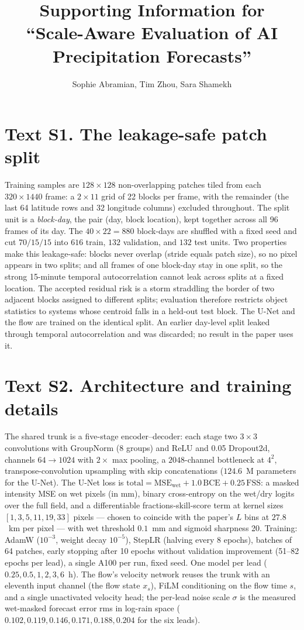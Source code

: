 \documentclass[11pt]{article}
\title{Supporting Information for\\
``Scale-Aware Evaluation of AI Precipitation Forecasts''}
\author{Sophie Abramian, Tim Zhou, Sara Shamekh}
\date{}
\begin{document}
\maketitle
\renewcommand{\thefigure}{S\arabic{figure}}

\section*{Text S1. The leakage-safe patch split}
Training samples are $128 \times 128$ non-overlapping patches tiled from
each $320 \times 1440$ frame: a $2 \times 11$ grid of 22 blocks per frame,
with the remainder (the last 64 latitude rows and 32 longitude columns)
excluded throughout. The split unit is a \emph{block-day}, the pair (day,
block location), kept together across all 96 frames of its day. The
$40 \times 22 = 880$ block-days are shuffled with a fixed seed and cut
$70/15/15$ into $616$ train, $132$ validation, and $132$ test units. Two
properties make this leakage-safe: blocks never overlap (stride equals
patch size), so no pixel appears in two splits; and all frames of one
block-day stay in one split, so the strong 15-minute temporal
autocorrelation cannot leak across splits at a fixed location. The accepted
residual risk is a storm straddling the border of two adjacent blocks
assigned to different splits; evaluation therefore restricts object
statistics to systems whose centroid falls in a held-out test block. The U-Net
and the flow are trained on the identical split. An earlier day-level split leaked through temporal autocorrelation
and was discarded; no result in the paper uses it.

\section*{Text S2. Architecture and training details}
The shared trunk is a five-stage encoder--decoder: each stage two
$3{\times}3$ convolutions with GroupNorm (8 groups) and ReLU and 0.05
Dropout2d, channels $64 \rightarrow 1024$ with $2\times$ max pooling, a
$2048$-channel bottleneck at $4^2$, transpose-convolution upsampling with
skip concatenations ($124.6$~M parameters for the U-Net). The
U-Net loss is $\mathrm{total} = \mathrm{MSE}_{\mathrm{wet}} +
1.0\,\mathrm{BCE} + 0.25\,\mathrm{FSS}$: a masked intensity MSE on wet
pixels (in mm), binary cross-entropy on the wet/dry logits over the full
field, and a differentiable fractions-skill-score term at kernel sizes
$[1, 3, 5, 11, 19, 33]$ pixels --- chosen to coincide with the paper's
$L$ bins at $27.8$~km per pixel --- with wet threshold $0.1$~mm and sigmoid
sharpness 20. Training: AdamW ($10^{-3}$, weight decay $10^{-5}$), StepLR
(halving every 8 epochs), batches of 64 patches, early stopping after 10
epochs without validation improvement (51--82 epochs per lead), a single
A100 per run, fixed seed. One model per lead
($0.25, 0.5, 1, 2, 3, 6$~h). The flow's velocity network reuses the trunk
with an eleventh input channel (the flow state $x_s$), FiLM conditioning on
the flow time $s$, and a
single unactivated velocity head; the per-lead noise scale $\sigma$ is the
measured wet-masked forecast error rms in log-rain space
($0.102, 0.119, 0.146, 0.171, 0.188, 0.204$ for the six leads).
\end{document}
